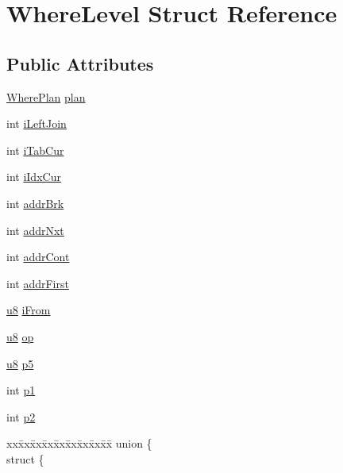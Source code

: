 \hypertarget{struct_where_level}{\section{Where\-Level Struct Reference}
\label{struct_where_level}
}
\subsection*{Public Attributes}
\begin{DoxyCompactItemize}
\item 
\hyperlink{struct_where_plan}{Where\-Plan} \hyperlink{struct_where_level_a4567b2ab4792fea7a1bc4e9baa494394}{plan}
\item 
int \hyperlink{struct_where_level_a600072864f71c568cabcbb6140f6955a}{i\-Left\-Join}
\item 
int \hyperlink{struct_where_level_aa31c27c3304de936a6ce974450c55592}{i\-Tab\-Cur}
\item 
int \hyperlink{struct_where_level_a0733f34c7987c721351ab0001d4b1dd9}{i\-Idx\-Cur}
\item 
int \hyperlink{struct_where_level_a06f788bd4109f394d162250af9582e45}{addr\-Brk}
\item 
int \hyperlink{struct_where_level_ab4b748f1fa2ec727f00ca42d9df60144}{addr\-Nxt}
\item 
int \hyperlink{struct_where_level_a493d44d8f3b53d4d47191d751f8a9a94}{addr\-Cont}
\item 
int \hyperlink{struct_where_level_a2d87c8fb787ca4111d7ab38a838325a8}{addr\-First}
\item 
\hyperlink{sqlite3_8c_a74a0f6424ae628af25f23f0a35f6ead3}{u8} \hyperlink{struct_where_level_a4d8e905640b12a5075ff5e2f395876dd}{i\-From}
\item 
\hyperlink{sqlite3_8c_a74a0f6424ae628af25f23f0a35f6ead3}{u8} \hyperlink{struct_where_level_a0253c213b81cd17481601e495d421706}{op}
\item 
\hyperlink{sqlite3_8c_a74a0f6424ae628af25f23f0a35f6ead3}{u8} \hyperlink{struct_where_level_a568ee11c7ecabb4259836ccc11025ae6}{p5}
\item 
int \hyperlink{struct_where_level_ad544492b3388cb82a4b3674e6c1fdb07}{p1}
\item 
int \hyperlink{struct_where_level_a9c60432a75f2252764e78128e4dad19b}{p2}
\item 
\begin{tabbing}
xx\=xx\=xx\=xx\=xx\=xx\=xx\=xx\=xx\=\kill
union \{\\
\>struct \{\\

\end{tabbing}
\end{DoxyCompactItemize}
